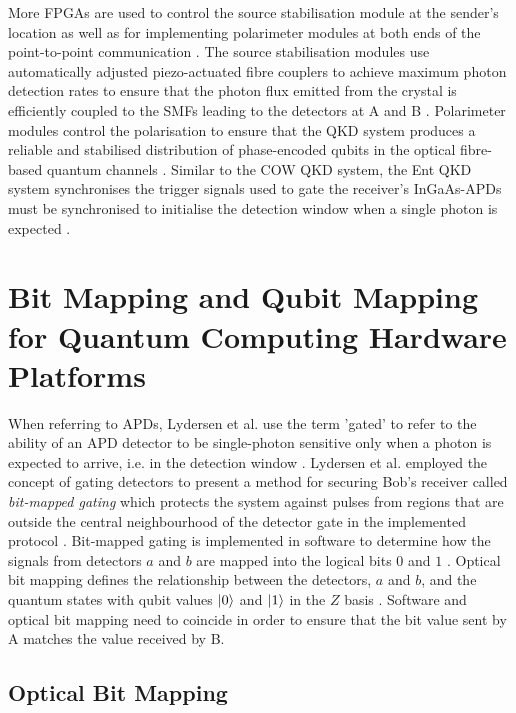 More FPGAs are used to control the source stabilisation module at the sender's location as well as for implementing \gls{polarimeter} modules at both ends of the point-to-point communication \cite{peev2009secoqc}. The source stabilisation modules use automatically adjusted \gls{piezo-actuated} fibre couplers to achieve maximum photon detection rates to ensure that the photon flux emitted from the crystal is efficiently coupled to the SMFs leading to the detectors at A and B \cite{peev2009secoqc}. Polarimeter modules control the polarisation to ensure that the QKD system produces a reliable and stabilised distribution of phase-encoded qubits in the optical fibre-based quantum channels \cite{peev2009secoqc}. Similar to the COW QKD system, the Ent QKD system synchronises the trigger signals used to gate the receiver's InGaAs-APDs must be synchronised to initialise the detection window when a single photon is expected \cite{peev2009secoqc}. 

\section{Bit Mapping and Qubit Mapping for Quantum Computing Hardware Platforms}

When referring to APDs, Lydersen et al. use the term 'gated' to refer to the ability of an APD detector to be single-photon sensitive only when a photon is expected to arrive, i.e. in the detection window \cite{lydersen2011secure}. Lydersen et al. employed the concept of gating detectors to present a method for securing Bob's receiver called \textit{bit-mapped gating} which protects the system against pulses from regions that are outside the central neighbourhood of the detector gate in the implemented protocol \cite{lydersen2011secure}. Bit-mapped gating is implemented in software to determine how the signals from detectors $a$ and $b$ are mapped into the logical bits $0$ and $1$ \cite{lydersen2011secure}. Optical bit mapping defines the relationship between the detectors, $a$ and $b$, and the quantum states with qubit values $\ket{0}$ and $\ket{1}$ in the $Z$ basis \cite{lydersen2011secure}. Software and optical bit mapping need to coincide in order to ensure that the bit value sent by A matches the value received by B. 

\subsection{Optical Bit Mapping}

